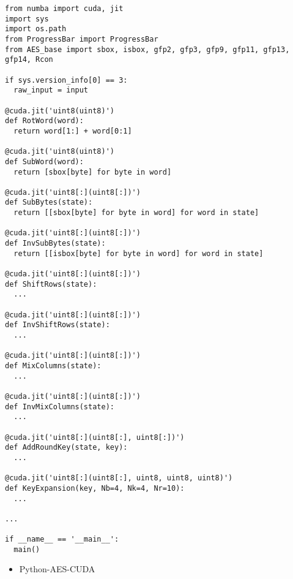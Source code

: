 \begin{verbatim}
from numba import cuda, jit
import sys
import os.path
from ProgressBar import ProgressBar
from AES_base import sbox, isbox, gfp2, gfp3, gfp9, gfp11, gfp13, gfp14, Rcon

if sys.version_info[0] == 3:
  raw_input = input

@cuda.jit('uint8(uint8)')
def RotWord(word):
  return word[1:] + word[0:1]

@cuda.jit('uint8(uint8)')
def SubWord(word):
  return [sbox[byte] for byte in word]

@cuda.jit('uint8[:](uint8[:])')
def SubBytes(state):
  return [[sbox[byte] for byte in word] for word in state]

@cuda.jit('uint8[:](uint8[:])')
def InvSubBytes(state):
  return [[isbox[byte] for byte in word] for word in state]

@cuda.jit('uint8[:](uint8[:])')
def ShiftRows(state):
  ...

@cuda.jit('uint8[:](uint8[:])')
def InvShiftRows(state):
  ...

@cuda.jit('uint8[:](uint8[:])')
def MixColumns(state):
  ...

@cuda.jit('uint8[:](uint8[:])')
def InvMixColumns(state):
  ...

@cuda.jit('uint8[:](uint8[:], uint8[:])')
def AddRoundKey(state, key):
  ...

@cuda.jit('uint8[:](uint8[:], uint8, uint8, uint8)')
def KeyExpansion(key, Nb=4, Nk=4, Nr=10):
  ...

...

if __name__ == '__main__':
  main()
\end{verbatim}

\begin{itemize}
  \item Python-AES-CUDA
\end{itemize}
